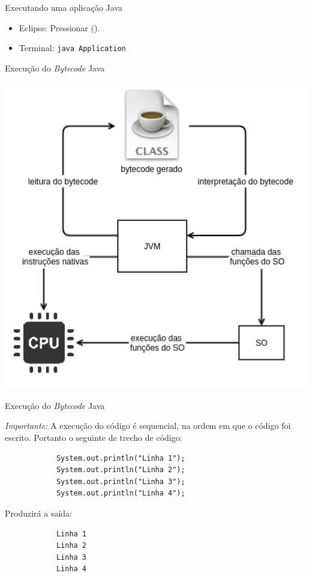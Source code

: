 \documentclass{beamer}
\newcommand{\icon}[1]{\raisebox{-.2\height}{\texttt{[image: \#1]}}}
\begin{document}
\begin{frame}{Executando uma aplicação Java}
    \begin{itemize}
        \item[] \icon{eclipse} Eclipse: Pressionar 
            (\menu{\icon{eclipse_run} Run}).

        \item[] \icon{terminal} Terminal: \texttt{java Application}
    \end{itemize}
\end{frame}


\begin{frame}{Execução do \textit{Bytecode} Java}
    \begin{center}
        \includegraphics[keepaspectratio,width=1\textwidth,height=0.8\textheight]{jvm_scheme}
    \end{center}
\end{frame}

\begin{frame}[fragile]{Execução do \textit{Bytecode} Java}
    \begin{center}
        \emph{Importante:} A execução do código é sequencial, na ordem em que o
        código foi escrito. Portanto o seguinte de trecho de código:

        \begin{verbatim}
            System.out.println("Linha 1");
            System.out.println("Linha 2");
            System.out.println("Linha 3");
            System.out.println("Linha 4");
        \end{verbatim}

        Produzirá a saída:

        \begin{verbatim}
            Linha 1
            Linha 2
            Linha 3
            Linha 4
        \end{verbatim}
    \end{center}
\end{frame}
\end{document}
